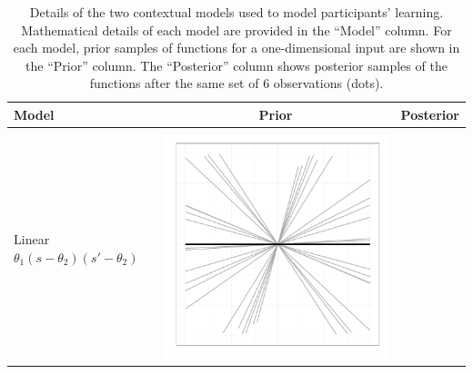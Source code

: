 \documentclass[a4paper,natbib]{apa6}
\begin{document}
\begin{table}[h!]
\tiny
\caption{Details of the two contextual models used to model participants' learning. Mathematical details of each model are provided in the ``Model'' column. For each model, prior samples of functions for a one-dimensional input are shown in the ``Prior'' column. The ``Posterior'' column shows posterior samples of the functions after the same set of 6 observations (dots).} 
\label{tab:kernels}
\footnotesize
\centering
 \begin{tabular}{lcc}
\bf{Model} & \bf{Prior} & \bf{Posterior}\\
\hline\\
\parbox[b]{5cm}{Linear\\ $\theta_1(s-\theta_2)(s'-\theta_2)$\\\\}& 
\includegraphics[scale=0.2]{figure1.pdf} &

\end{tabular}
\end{table}
\end{document}
